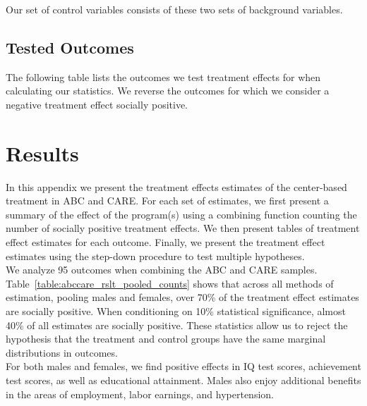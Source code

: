 \begin{appendices}
\noindent Our set of control variables consists of these two sets of background variables.

\singlespacing

\doublespacing
\subsection{Tested Outcomes}

\noindent The following table lists the outcomes we test treatment effects for when calculating our statistics. We reverse the outcomes for which we consider a negative treatment effect socially positive.

\singlespacing

\doublespacing

\setcounter{figure}{0}  \renewcommand{\thefigure}{C.\arabic{figure}}
\setcounter{table}{0}   \renewcommand{\thetable}{C.\arabic{table}}

\section{Results} \label{appendix:results}

\noindent In this appendix we present the treatment effects estimates of the center-based treatment in ABC and CARE. For each set of estimates, we first present a summary of the effect of the program(s) using a combining function counting the number of socially positive treatment effects. We then present tables of treatment effect estimates for each outcome. Finally, we present the treatment effect estimates using the step-down procedure to test multiple hypotheses. \\

\noindent We analyze 95 outcomes when combining the ABC and CARE samples. Table~\ref{table:abccare_rslt_pooled_counts} shows that across all methods of estimation, pooling males and females, over 70\% of the treatment effect estimates are socially positive. When conditioning on 10\% statistical significance, almost 40\% of all estimates are socially positive. These statistics allow us to reject the hypothesis that the treatment and control groups have the same marginal distributions in outcomes. \\

\noindent For both males and females, we find positive effects in IQ test scores, achievement test scores, as well as educational attainment. Males also enjoy additional benefits in the areas of employment, labor earnings, and hypertension. \\


\end{appendices}
